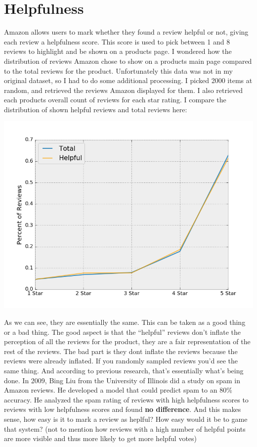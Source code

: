 \documentclass[a4paper,10pt]{article}
\begin{document}
\section*{Helpfulness}
Amazon allows users to mark whether they found a review helpful or not, giving each review a helpfulness score. This score is used to pick between 1 and 8 reviews to highlight and be shown on a products page. I wondered how the distribution of reviews Amazon chose to show on a products main page compared to the total reviews for the product. Unfortunately this data was not in my original dataset, so I had to do some additional processing. I picked 2000 items at random, and retrieved the reviews Amazon displayed for them. I also retrieved each products overall count of reviews for each star rating. I compare the distribution of shown helpful reviews and total reviews here:
\begin{center}
    \includegraphics[scale=0.6]{helpfulness.png}
\end{center}
As we can see, they are essentially the same. This can be taken as a good thing or a bad thing. The good aspect is that the \enquote{helpful} reviews don't inflate the perception of all the reviews for the product, they are a fair representation of the rest of the reviews. The bad part is they dont inflate the reviews because the reviews were already inflated. If you randomly sampled reviews you'd see the same thing. And according to previous research, that's essentially what's being done. In 2009, Bing Liu from the University of Illinois did a study on spam in Amazon reviews. He developed a model that could predict spam to an 80\% accuracy. He analyzed the spam rating of reviews with high helpfulness scores to reviews with low helpfulness scores and found \textbf{no difference}. And this makes sense, how easy is it to mark a review as heplful? How easy would it be to game that system? (not to mention how reviews with a high number of helpful points are more visible and thus more likely to get more helpful votes)
\end{document}
